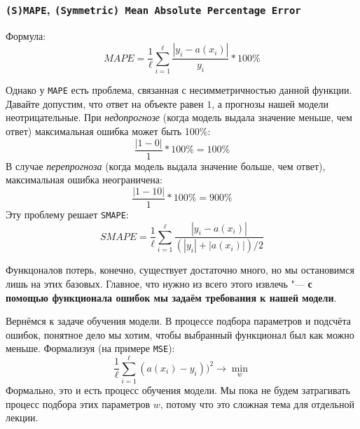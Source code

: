\subsubsection*{\texttt{(S)MAPE}, \texttt{(Symmetric) Mean Absolute Percentage Error}}

Формула:
\[
MAPE = \frac{1}{\ell}\sum_{i=1}^\ell \frac{|y_i - a(x_i)|}{y_i} * 100\%
\]

Однако у \texttt{MAPE} есть проблема, связанная с несимметричностью 
данной функции. Давайте допустим, что ответ на объекте равен $1$,
а прогнозы нашей модели неотрицательные. При \textit{недопрогнозе}
(когда модель выдала значение меньше, чем ответ) максимальная ошибка может быть 100\%:
\[
\frac{|1 - 0|}{1} * 100\%= 100\%
\]
В случае \textit{перепрогноза} (когда модель выдала значение больше, 
чем ответ), максимальная ошибка неограничена:
\[
\frac{|1 - 10|}{1} * 100\% = 900\%
\]
Эту проблему решает \texttt{SMAPE}:
\[
SMAPE = \frac{1}{\ell}\sum_{i=1}^\ell \frac{|y_i - a(x_i)|}{(|y_i| + |a(x_i)|)/2}
\]

Функцоналов потерь, конечно, существует достаточно много, но мы 
остановимся лишь на этих базовых. Главное, что нужно из всего этого
извлечь "--- \textbf{с помощью функционала ошибок мы задаём требования
к нашей модели}.

Вернёмся к задаче обучения модели. В процессе подбора параметров 
и подсчёта ошибок, понятное дело мы хотим, чтобы выбранный функционал 
был как можно меньше. Формализуя (на примере \texttt{MSE}):
\[
\frac{1}{\ell}\sum_{i=1}^\ell(a(x_i) - y_i))^2 \rightarrow \min_w 
\]
Формально, это и есть процесс обучения модели. Мы пока не будем затрагивать процесс подбора этих параметров $w$, потому что это
сложная тема для отдельной лекции.